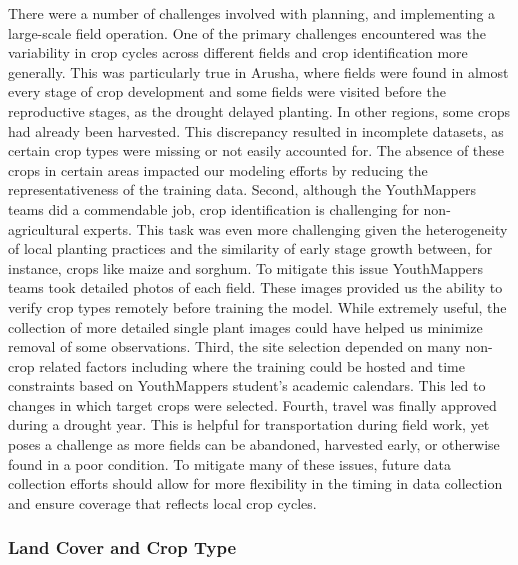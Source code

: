 \documentclass[
  journal,
  twocolumn]{IEEEtran}
\begin{document}
There were a number of challenges involved with planning, and
implementing a large-scale field operation. One of the primary
challenges encountered was the variability in crop cycles across
different fields and crop identification more generally. This was
particularly true in Arusha, where fields were found in almost every
stage of crop development and some fields were visited before the
reproductive stages, as the drought delayed planting. In other regions,
some crops had already been harvested. This discrepancy resulted in
incomplete datasets, as certain crop types were missing or not easily
accounted for. The absence of these crops in certain areas impacted our
modeling efforts by reducing the representativeness of the training
data. Second, although the YouthMappers teams did a commendable job,
crop identification is challenging for non-agricultural experts. This
task was even more challenging given the heterogeneity of local planting
practices and the similarity of early stage growth between, for
instance, crops like maize and sorghum. To mitigate this issue
YouthMappers teams took detailed photos of each field. These images
provided us the ability to verify crop types remotely before training
the model. While extremely useful, the collection of more detailed
single plant images could have helped us minimize removal of some
observations. Third, the site selection depended on many non-crop
related factors including where the training could be hosted and time
constraints based on YouthMappers student's academic calendars. This led
to changes in which target crops were selected. Fourth, travel was
finally approved during a drought year. This is helpful for
transportation during field work, yet poses a challenge as more fields
can be abandoned, harvested early, or otherwise found in a poor
condition. To mitigate many of these issues, future data collection
efforts should allow for more flexibility in the timing in data
collection and ensure coverage that reflects local crop cycles.

\hypertarget{land-cover-and-crop-type}{%
\subsubsection{Land Cover and Crop
Type}\label{land-cover-and-crop-type}}
\end{document}
